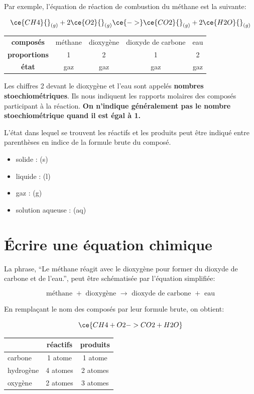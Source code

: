 \documentclass[
  11pt,
  a4paper,
  openany]{book}
\providecommand{\tightlist}{%
  \setlength{\itemsep}{0pt}\setlength{\parskip}{0pt}}
\begin{document}
Par exemple, l'équation de réaction de combustion du méthane est la suivante:

\[ \ce{CH4} {}_{(g)} + 2 \ce{O2} {}_{(g)} \ce{->} \ce{CO2} {}_{(g)} + 2 \ce{H2O} {}_{(g)} \]

\begin{longtable}[]{@{}ccccc@{}}
\toprule\noalign{}
\endhead
\bottomrule\noalign{}
\endlastfoot
\textbf{composés} & méthane & dioxygène & dioxyde de carbone & eau \\
\textbf{proportions} & 1 & 2 & 1 & 2 \\
\textbf{état} & gaz & gaz & gaz & gaz \\
\end{longtable}

Les chiffres 2 devant le dioxygène et l'eau sont appelés \textbf{nombres stoechiométriques}. Ils nous indiquent les rapports molaires des composés participant à la réaction. \textbf{On n'indique généralement pas le nombre stoechiométrique quand il est égal à 1.}

L'état dans lequel se trouvent les réactifs et les produits peut être indiqué entre parenthèses en indice de la formule brute du composé.

\begin{itemize}
\tightlist
\item
  solide : (s)
\item
  liquide : (l)
\item
  gaz : (g)
\item
  solution aqueuse : (aq)
\end{itemize}

\section{Écrire une équation chimique}\label{uxe9crire-une-uxe9quation-chimique}

La phrase, ``Le méthane réagit avec le dioxygène pour former du dioxyde de carbone et de l'eau.'', peut être schématisée par l'équation simplifiée:

\[ \text{méthane } + \text{ dioxygène } \longrightarrow \text{ dioxyde de carbone } + \text{ eau} \]

En remplaçant le nom des composés par leur formule brute, on obtient:

\[ \ce{CH4 + O2 -> CO2 + H2O} \]

\begin{longtable}[]{@{}lcc@{}}
\toprule\noalign{}
& réactifs & produits \\
\midrule\noalign{}
\endhead
\bottomrule\noalign{}
\endlastfoot
carbone & 1 atome & 1 atome \\
hydrogène & 4 atomes & 2 atomes \\
oxygène & 2 atomes & 3 atomes \\
\end{longtable}
\end{document}
